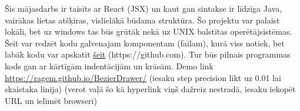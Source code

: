 \documentclass[12pt, a4]{article}
\begin{document}
\newpage
Šis mājasdarbs ir taisīts ar React (JSX) un kaut gan sintakse ir līdzīga Java, vairākas lietas atšķiras, vislielākā būdama struktūra.
Šo projektu var palaist lokāli, bet uz windows tas būs grūtāk nekā uz UNIX balstītas operētājsistēmas.
Šeit var redzēt kodu galvenajam komponentam (failam), kurā viss notiek, bet labāk kodu var apskatīt \href{https://github.com/ragem/BezierDrawer/blob/master/src/Components/BezierDrawer/BezierDrawer.component.js}{šeit}
(https://github.com).
Tur būs pilnais programmas kods gan ar kārtīgām indentācijām un krāsām.
\newline
Demo link \url{https://ragem.github.io/BezierDrawer/} 
\newline
(iesaku step precision likt uz 0.01 lai skaistaka linija)
\newline
(verot vaļā šo kā hyperlink viņš dažreiz nestradā, iesaku iekopēt URL un ielīmēt browserī)
\end{document}
